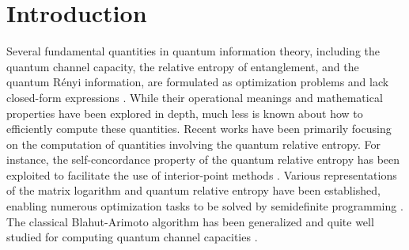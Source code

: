 \documentclass{article}
\begin{document}
%
%
%

\section{Introduction}
Several fundamental quantities in quantum information theory, including the quantum channel capacity, the relative entropy of entanglement, and the quantum R\'{e}nyi information, are formulated as optimization problems and lack closed-form expressions \cite{Hayashi2017,Wilde2017}. 
While their operational meanings and mathematical properties have been explored in depth, much less is known %
about
how to efficiently compute these quantities. 
Recent works 
have been primarily focusing 
on 
the computation of quantities involving 
the quantum relative entropy. 
For instance, the self-concordance property of the quantum relative entropy has been exploited to facilitate the use of interior-point methods \citep{Fawzi2023,Faybusovich2017,He2024b}. 
Various 
representations of the matrix logarithm and quantum relative entropy
have been established, enabling numerous optimization tasks to be solved by semidefinite programming \cite{Brown2024,Chandrasekaran2017,Fawzi2022,Fawzi2017a,Fawzi2019,Frenkel2023,He2024b,Huang2024,Jencova2024,Kossmann2024a,Kossmann2024b}. 
The classical Blahut-Arimoto algorithm has been generalized and quite well studied for computing quantum channel capacities \cite{Hayashi2024,He2024a,Li2019b,Nagaoka1998,Ramakrishnan2021}. 
\end{document}
